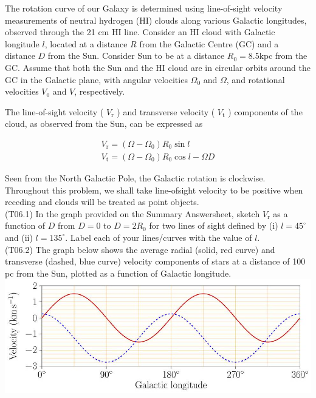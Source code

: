\documentclass[10pt]{article}
\begin{document}
    The rotation curve of our Galaxy is determined using line-of-sight velocity measurements of neutral hydrogen (HI) clouds along various Galactic longitudes, observed through the 21 cm HI line. Consider an HI cloud with Galactic longitude $l$, located at a distance $R$ from the Galactic Centre (GC) and a distance $D$ from the Sun. Consider Sun to be at a distance $R_{0}=8.5 \mathrm{kpc}$ from the GC. Assume that both the Sun and the HI cloud are in circular orbits around the GC in the Galactic plane, with angular velocities $\Omega_{0}$ and $\Omega$, and rotational velocities $V_{0}$ and $V$, respectively.

    The line-of-sight velocity ( $V_{\mathrm{r}}$ ) and transverse velocity ( $V_{\mathrm{t}}$ ) components of the cloud, as observed from the Sun, can be expressed as
    
    $$
    \begin{gathered}
    V_{\mathrm{r}}=\left(\Omega-\Omega_{0}\right) R_{0} \sin l \\
    V_{\mathrm{t}}=\left(\Omega-\Omega_{0}\right) R_{0} \cos l-\Omega D
    \end{gathered}
    $$
    
    Seen from the North Galactic Pole, the Galactic rotation is clockwise. Throughout this problem, we shall take line-ofsight velocity to be positive when receding and clouds will be treated as point objects.\\
    (T06.1) In the graph provided on the Summary Answersheet, sketch $V_{\mathrm{r}}$ as a function of $D$ from $D=0$ to $D=2 R_{0}$ for two lines of sight defined by (i) $l=45^{\circ}$ and (ii) $l=135^{\circ}$. Label each of your lines/curves with the value of $l$.\\
    (T06.2) The graph below shows the average radial (solid, red curve) and transverse (dashed, blue curve) velocity components of stars at a distance of 100 pc from the Sun, plotted as a function of Galactic longitude.\\
    \includegraphics[max width=\textwidth, center]{2025_08_23_e94579452776a99c4850g-05}
    
\end{document}

